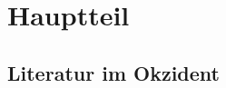 \chapter{Hauptteil}

\section{Literatur im Okzident}

\blindtext[5]

\blindtext[5]

\blindtext[5]

\blindtext[5]

\blindtext[5]